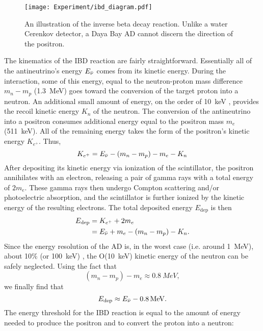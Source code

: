 \documentclass[../thesis.tex]{subfiles}
\begin{document}
\begin{figure}[ht]
  \texttt{[image: Experiment/ibd\_diagram.pdf]}
  \caption{An illustration of the inverse beta decay reaction. Unlike a water Cerenkov detector, a Daya Bay AD cannot discern the direction of the positron.}
  \label{fig:expIBD}
\end{figure}

The kinematics of the IBD reaction are fairly straightforward. Essentially all of the antineutrino's energy $E_{\bar\nu}$ comes from its kinetic energy. During the interaction, some of this energy, equal to the neutron-proton mass difference $m_n - m_p$ (1.3~MeV) goes toward the conversion of the target proton into a neutron. An additional small amount of energy, on the order of 10~keV \cite{An_2017}, provides the recoil kinetic energy $K_n$ of the neutron. The conversion of the antineutrino into a positron consumes additional energy equal to the positron mass $m_e$ (511~keV). All of the remaining energy takes the form of the positron's kinetic energy $K_{e^+}$. Thus,
\begin{equation}
  K_{e^+} = E_{\bar\nu} - (m_n - m_p) - m_e - K_n
\end{equation}
After depositing its kinetic energy via ionization of the scintillator, the positron annihilates with an electron, releasing a pair of gamma rays with a total energy of $2m_e$. These gamma rays then undergo Compton scattering and/or photoelectric absorption, and the scintillator is further ionized by the kinetic energy of the resulting electrons. The total deposited energy $E_{\mathrm{dep}}$ is then
\begin{align*}
  E_{\mathrm{dep}} &= K_{e^+} + 2m_e \\
             &= E_{\bar\nu} + m_e - (m_n - m_p) - K_n.
\end{align*}
Since the energy resolution of the AD is, in the worst case (i.e. around 1~MeV), about 10\% (or 100~keV) \cite{An_2017}, the O(10~keV) kinetic energy of the neutron can be safely neglected. Using the fact that
\begin{equation}
  (m_n - m_p) - m_e \approx \SI{0.8}{MeV},
\end{equation}
we finally find that
\begin{equation}
  \label{eq:enuToEdep}
  E_{\mathrm{dep}} \approx E_{\bar\nu} - \SI{0.8}{MeV}.
\end{equation}
The energy threshold for the IBD reaction is equal to the amount of energy needed to produce the positron and to convert the proton into a neutron:
\end{document}
